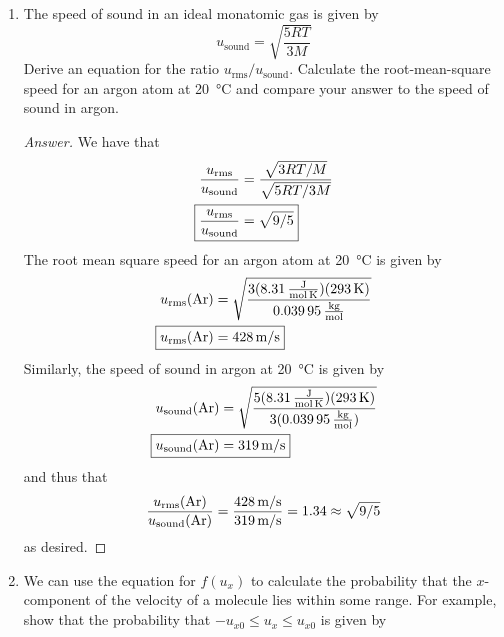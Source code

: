 \documentclass[../psets.tex]{subfiles}
\begin{document}
\begin{enumerate}[label={\textbf{27-\arabic*.}},leftmargin=3.5em]
\begin{proof}[Answer]
    \end{proof}
    \item The speed of sound in an ideal monatomic gas is given by
    \begin{equation*}
        u_\text{sound} = \sqrt{\frac{5RT}{3M}}
    \end{equation*}
    Derive an equation for the ratio $u_\text{rms}/u_\text{sound}$. Calculate the root-mean-square speed for an argon atom at \SI{20}{\celsius} and compare your answer to the speed of sound in argon.
    \begin{proof}[Answer]
        We have that
        \begin{align*}
            \frac{u_\text{rms}}{u_\text{sound}} &= \frac{\sqrt{3RT/M}}{\sqrt{5RT/3M}}\\
            \Aboxed{\frac{u_\text{rms}}{u_\text{sound}} &= \sqrt{9/5}}
        \end{align*}
        The root mean square speed for an argon atom at \SI{20}{\celsius} is given by
        \begin{align*}
            u_\text{rms}(\ce{Ar}) &= \sqrt{\frac{3(\SI[per-mode=fraction]{8.31}{\joule\per\mole\per\kelvin})(\SI{293}{\kelvin})}{\SI[per-mode=fraction]{0.03995}{\kilo\gram\per\mole}}}\\
            \Aboxed{u_\text{rms}(\ce{Ar}) &= \SI[per-mode=symbol]{428}{\meter\per\second}}
        \end{align*}
        Similarly, the speed of sound in argon at \SI{20}{\celsius} is given by
        \begin{align*}
            u_\text{sound}(\ce{Ar}) &= \sqrt{\frac{5(\SI[per-mode=fraction]{8.31}{\joule\per\mole\per\kelvin})(\SI{293}{\kelvin})}{3(\SI[per-mode=fraction]{0.03995}{\kilo\gram\per\mole})}}\\
            \Aboxed{u_\text{sound}(\ce{Ar}) &= \SI[per-mode=symbol]{319}{\meter\per\second}}
        \end{align*}
        and thus that
        \begin{equation*}
            \frac{u_\text{rms}(\ce{Ar})}{u_\text{sound}(\ce{Ar})} = \frac{\SI[per-mode=symbol]{428}{\meter\per\second}}{\SI[per-mode=symbol]{319}{\meter\per\second}}
            = 1.34
            \approx \sqrt{9/5}
        \end{equation*}
        as desired.
    \end{proof}
    \setcounter{enumi}{11}
    \item We can use the equation for $f(u_x)$ to calculate the probability that the $x$-component of the velocity of a molecule lies within some range. For example, show that the probability that $-u_{x0}\leq u_x\leq u_{x0}$ is given by

\end{enumerate}
\end{document}
